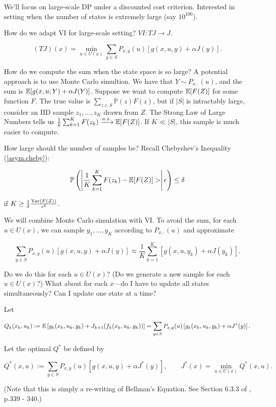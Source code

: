 We'll focus on large-scale DP under a discounted cost criterion. Interested in setting when the number of states is extremely large (say \(10^{100}\)).

How do we adapt VI for large-scale setting? \(VI: TJ \to J\).

\[
(TJ)(x) = \min_{u \in U(x)} \sum_{y \in S} P_{x,y}(u) [g(x,u,y) + \alpha J(y)].
\]

How do we compute the sum when the state space is so large? A potential approach is to use Monte Carlo simultion. We have that \(Y \sim P_{x, \cdot}(u)\), and the sum is \(\mathbb{E}[g(x, u,Y) + \alpha J(Y)]\). Suppose we want to compute \(\mathbb{E}[F(Z)]\) for some function \(F\). The true value is \(\sum_{z \in S} \mathbb{P}(z) F(z)\), but if \(|S|\) is intractably large, consider an IID sample \(z_1, \ldots, z_K \) drawn from \(Z\). The Strong Law of Large Numbers tells us \(\frac{1}{k} \sum_{k=1}^K F(z_k) \xrightarrow{a.s.} \mathbb{E}[F(Z)]\). If \(K \ll |S|\), this sample is much easier to compute.

How large should the number of samples be? Recall Chebyshev's Inequality (\ref{asym.cheby}):

\[
\mathbb{P}\left(  \left|  \frac{1}{K} \sum_{k=1}^K F(z_k) - \mathbb{E}[F(Z)] > \right| \epsilon \right) \leq \delta
\]

if \(K \geq \frac{1}{\delta} \frac{\mathrm{Var}(F(Z))}{\epsilon^2}\).

We will combine Monte Carlo simulation with VI. To avoid the sum, for each \(u \in U(x)\), we can sample \(y_1, \ldots, y_K\) according to \(P_{x, \cdot}(u)\) and approximate

\[
\sum_{y \in S} P_{x,y}(u) [g(x,u,y) + \alpha J(y)] \approx  \frac{1}{K} \sum_{k=1}^K \left[ g(x,u,y_k) + \alpha J(y_k) \right] .
\]

Do we do this for each \(u \in U(x)\)? (Do we generate a new sample for each \(u \in U(x)\)?) What about for each \(x\)---do I have to update all states simultaneously? Can I update one state at a time?

\begin{definition}

Let 

\[
Q_k(x_k, u_k) :=  \mathbb{E} \left[g_k(x_k, u_k, y_k) + J_{k+1}(f_k(x_k, u_k, y_k)) \right] =  \sum_{y \in S} P_{x,y}(u) \left[ g_k(x_k, u_k, y_k) + \alpha J^*(y) \right].
\]

Let the optimal \(Q^*\) be defined by

\[
Q^*(x,u) := \sum_{y \in S} P_{x,y}(u) \left[ g(x, u, y) + \alpha J^*(y) \right], \qquad J^*(x) = \min_{u \in U(x)} Q^*(x,u).
\]

(Note that this is simply a re-writing of Bellman's Equation. See Section 6.3.3 of \citet{v1_bertsekas2012dynamic}, p.339 - 340.)

\end{definition}

